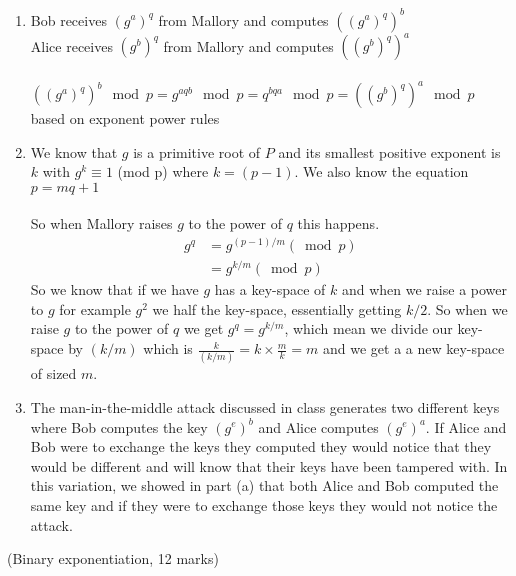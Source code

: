\documentclass{assignment}
\begin{document}
\begin{problemlist}
\begin{problem}
\begin{answer}
\begin{enumerate}[label=(\alph*)]
	\item Bob receives $(g^a)^q$ from Mallory and computes $((g^a)^q)^b$ \\
    	  Alice receives  $(g^b)^q$ from Mallory and computes $((g^b)^q)^a$ \\ \\
          $((g^a)^q)^b \mod p = g^{aqb} \mod p = q^{bqa} \mod p = ((g^b)^q)^a \mod p$ \\ 
          based on exponent power rules
	\item We know that $g$ is a primitive root of $P$ and its smallest positive exponent is $k$ with $g^k \equiv 1$ (mod p) where $k = (p-1)$. We also know the equation $p = mq + 1$\\ \\
    So when Mallory raises $g$ to the power of $q$ this happens.
    	  \begin{align*}
          	g^q &= g^{(p-1) / m} (\bmod p)\\
            	&= g^{k/m} (\bmod p)
		  \end{align*}
    So we know that if we have $g$ has a key-space of $k$ and when we raise a power to $g$ for example $g^2$ we half the key-space, essentially getting $k/2$. So when we raise $g$ to the power of $q$ we get $g^q = g^{k/m}$, which mean we divide our key-space by $(k/m)$ which is $\frac{k}{(k/m)} = k \times \frac{m}{k} = m$ and we get a a new key-space of sized $m$.
	\item The man-in-the-middle attack discussed in class generates two different keys where Bob computes the key $(g^e)^b$ and Alice computes $(g^e)^a$. If Alice and Bob were to exchange the keys they computed they would notice that they would be different and will know that their keys have been tampered with. In this variation, we showed in part (a) that both Alice and Bob computed the same key and if they were to exchange those keys they would not notice the attack.   
\end{enumerate}

\end{answer}
\end{problem}


\pbitem (Binary exponentiation, 12 marks)
\begin{problem}
\begin{answer}


\end{answer}
\end{problem}
\end{problemlist}
\end{document}
